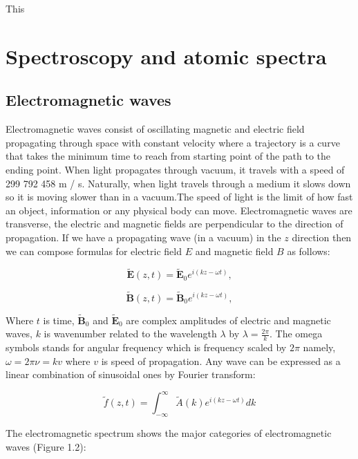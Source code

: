 \documentclass[a4paper,oneside,openright,11pt]{book}
\begin{document}
This 

\section{Spectroscopy and atomic spectra}

\subsection{Electromagnetic waves}
 
Electromagnetic waves consist of oscillating magnetic and electric field propagating through space with constant velocity where a trajectory is a curve that takes the minimum time to reach from starting point of the path to the ending point. When light propagates through vacuum, it travels with a speed of 299 792 458 m / s. Naturally, when light travels through a medium it slows down so it is moving slower than in a vacuum.The speed of light is the limit of how fast an object, information or any physical body can move. Electromagnetic waves are transverse, the electric and magnetic fields are perpendicular to the direction of propagation. If we have a propagating wave (in a vacuum) in the $z$ direction then we can compose formulas for electric field $E$ and magnetic field $B$ as follows:\cite{griffiths}

\begin{equation}
    \tilde{\textbf{E}}(z, t) = \tilde{\textbf{E}}_{0}e^{i(kz - \omega t)},
\end{equation}
    
\begin{equation}
    \tilde{\textbf{B}}(z, t) =\tilde{\textbf{B}}_{0}e^{i(kz - \omega t)},
\end{equation}

Where $t$ is time, $\tilde{\textbf{B}}_{0}$ and $\tilde{\textbf{E}}_{0}$ are complex amplitudes of electric and magnetic waves, $k$ is wavenumber related to the wavelength $\lambda$ by $\lambda = \frac{2 \pi}{k}$. The omega symbols stands for angular frequency which is frequency scaled by $2 \pi$ namely, $\omega = 2 \pi \nu = kv$ where $v$ is speed of propagation. Any wave can be expressed as a linear combination of sinusoidal ones by Fourier transform:\cite{griffiths}

\begin{equation}
    \tilde{f}(z, t) = \int_{-\infty}^{\infty} \tilde{A}(k)e^{i(kz - \omega t)} dk
\end{equation}

The electromagnetic spectrum shows the major categories of electromagnetic waves (Figure 1.2):
\noindent
\end{document}
